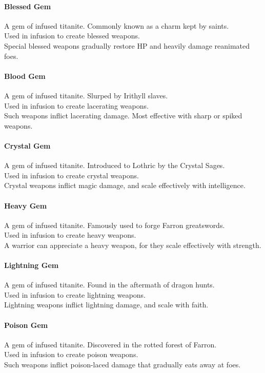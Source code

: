 \documentclass[twocolumn,a4paper]{article}
\begin{document}
\paragraph{Blessed Gem}
A gem of infused titanite. Commonly known as a charm kept by saints.\\
Used in infusion to create blessed weapons.\\
Special blessed weapons gradually restore HP and heavily damage reanimated foes.
\paragraph{Blood Gem}
A gem of infused titanite. Slurped by Irithyll slaves.\\
Used in infusion to create lacerating weapons.\\
Such weapons inflict lacerating damage. Most effective with sharp or spiked weapons.
\paragraph{Crystal Gem}
A gem of infused titanite. Introduced to Lothric by the Crystal Sages.\\
Used in infusion to create crystal weapons.\\
Crystal weapons inflict magic damage, and scale effectively with intelligence.
\paragraph{Heavy Gem}
A gem of infused titanite. Famously used to forge Farron greatswords.\\
Used in infusion to create heavy weapons.\\
A warrior can appreciate a heavy weapon, for they scale effectively with strength.
\paragraph{Lightning Gem}
A gem of infused titanite. Found in the aftermath of dragon hunts.\\
Used in infusion to create lightning weapons.\\
Lightning weapons inflict lightning damage, and scale with faith.
\paragraph{Poison Gem}
A gem of infused titanite. Discovered in the rotted forest of Farron.\\
Used in infusion to create poison weapons.\\
Such weapons inflict poison-laced damage that gradually eats away at foes.
\end{document}

